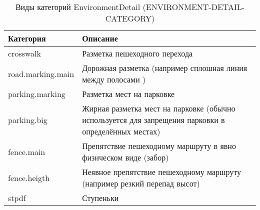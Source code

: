         \begin{center}
          \begin{xltabular}{\linewidth}{|l|X|}
            \caption{Виды категорий EnvironmentDetail (ENVIRONMENT-DETAIL-CATEGORY)}\\           \hline
            Категория         & Описание                                                                                             \\ \hline
            crosswalk         & Разметка пешеходного перехода                                                                        \\ \hline
            road.marking.main & Дорожная разметка (например сплошная линия между полосами )                                          \\ \hline
            parking.marking   & Разметка мест на парковке                                                                            \\ \hline
            parking.big       & Жирная разметка мест на парковке (обычно используется для запрещения парковки в определённых местах) \\ \hline
            fence.main        & Препятствие пешеходному маршруту в явно физическом виде (забор)                                      \\ \hline
            fence.heigth      & Неявное препятствие пешеходному маршруту (например резкий перепад высот)                             \\ \hline
            stpdf             & Ступеньки                                                                                            \\ \hline
          \end{xltabular}
        \end{center}



